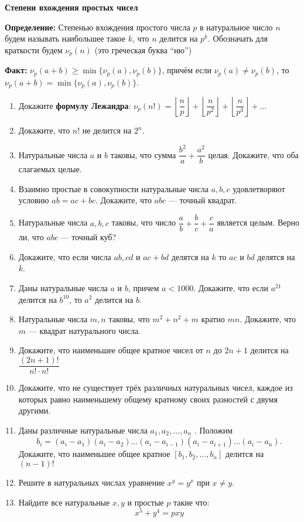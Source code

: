 \documentclass{article}
\begin{document}
\large
	
\begin{center}
	\textbf{Степени вхождения простых чисел}
\end{center}

\textbf{Определение:} Степенью вхождения простого числа $p$ в натуральное число $n$ будем называть наибольшее такое $k$, что $n$ делится на $p^k$. Обозначать для краткости будем $\nu_p(n)$ (это греческая буква “ню”)

\textbf{Факт:}  $\nu_p(a + b) \ge \min\{\nu_p(a),\nu_p(b)\}$, причём если $\nu_p(a) \neq \nu_p(b)$, то $\nu_p(a + b) = \min\{\nu_p (a), \nu_p(b)\}$.

\begin{enumerate}[label*=\protect\fbox{\arabic{enumi}}]
	
\item Докажите \textbf{формулу Лежандра}: $\nu_p(n!)=\left\lfloor \dfrac{n}{p}\right\rfloor+\left\lfloor \dfrac{n}{p^2} \right\rfloor+\left\lfloor \dfrac{n}{p^3} \right\rfloor+...$
\item Докажите, что $n!$ не делится на $2^n$.

\item Натуральные числа $a$ и $b$ таковы, что сумма $\dfrac{b^2}{a} + \dfrac{a^2}{b}$ целая. Докажите, что оба слагаемых целые.
\item Взаимно простые в совокупности натуральные числа $a, b, c$ удовлетворяют условию
$ab = ac + bc$. Докажите, что $abc$ — точный квадрат.
\item Натуральные числа $a, b, c$ таковы, что число $\dfrac{a}{b} + \dfrac{b}{c} + \dfrac{c}{a}$ является целым. Верно ли,
что $abc$ — точный куб?
\item Докажите, что если числа $ab, cd$ и $ac + bd$ делятся на $k$ то $ac$ и $bd$ делятся на $k$.
\item Даны натуральные числа $a$ и $b$, причем $a < 1000$. Докажите, что если $a^{21}$ делится на $b^{10}$, то $a^2$ делится на $b$.
\item Натуральные числа $m, n$ таковы, что $m^2 + n^2 + m$ кратно $mn$. Докажите, что $m$ — квадрат натурального числа.
\item Докажите, что наименьшее общее кратное чисел от $n$ до $2n + 1$ делится на $\dfrac{(2n + 1)!}{n!\cdot n!}$
\item Докажите, что не существует трёх различных натуральных чисел, каждое из которых равно наименьшему общему кратному своих разностей с двумя другими.
\item Даны различные натуральные числа $a_1 , a_2 , \dotsc , a_n$ . Положим
$$b_i = (a_i - a_1)(a_i - a_2)\dotsc(a_i - a_{i-1})(a_i - a_{i+1})\dotsc(a_i - a_n).$$
Докажите, что наименьшее общее кратное $[b_1 , b_2 , \dotsc , b_n ]$ делится на $(n - 1)!$
\item Решите в натуральных числах уравнение $x^y = y^x$ при $x \neq y$.
\item Найдите все натуральные $x, y$ и простые $p$ такие что:
$$x^5 + y^4 = pxy$$
\end{enumerate}
\end{document}
